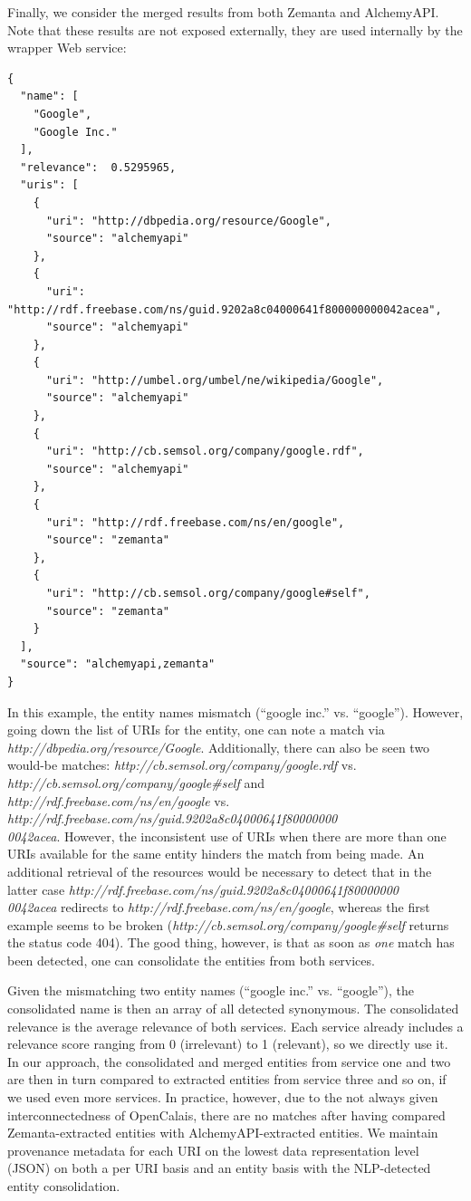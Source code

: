 Finally, we consider the merged results from both Zemanta and AlchemyAPI. Note that these results are not exposed externally, they are used internally by the wrapper Web service:

\begin{lstlisting}
{
  "name": [
    "Google",
    "Google Inc."
  ],
  "relevance":  0.5295965,
  "uris": [
    {
      "uri": "http://dbpedia.org/resource/Google",
      "source": "alchemyapi"
    },
    {
      "uri": "http://rdf.freebase.com/ns/guid.9202a8c04000641f800000000042acea",
      "source": "alchemyapi"
    },
    {
      "uri": "http://umbel.org/umbel/ne/wikipedia/Google",
      "source": "alchemyapi"
    },
    {
      "uri": "http://cb.semsol.org/company/google.rdf",
      "source": "alchemyapi"
    },
    {
      "uri": "http://rdf.freebase.com/ns/en/google",
      "source": "zemanta"
    },
    {
      "uri": "http://cb.semsol.org/company/google#self",
      "source": "zemanta"
    }
  ],
  "source": "alchemyapi,zemanta"
}
\end{lstlisting}

In this example, the entity names mismatch (``google inc.'' vs. ``google''). However, going down the list of URIs for
the entity, one can note a match via \textit{http://dbpedia.org/resource/Google}. Additionally, there can also
be seen two would-be matches: \textit{http://cb.semsol.org/company/google.rdf}
vs. \textit{http://cb.semsol.org/company/google\#self} and
\textit{http://rdf.freebase.com/ns/en/google} vs.
\textit{http://rdf.freebase.com/ns/guid.9202a8c04000641f80000000\\0042acea}. However, the inconsistent use of
URIs when there are more than one URIs available for the same entity hinders the match from being made. An additional
retrieval of the resources would be necessary to detect that in the latter case
\textit{http://rdf.freebase.com/ns/guid.9202a8c04000641f80000000\\0042acea} redirects to
\textit{http://rdf.freebase.com/ns/en/google}, whereas the first example seems to be broken
(\textit{http://cb.semsol.org/company/google\#self} returns the status code 404). The good thing, however, is
that as soon as \emph{one} match has been detected, one can consolidate the entities from both services.

Given the mismatching two entity names (``google inc.'' vs. ``google''), the consolidated name is then an array of all
detected synonymous. The consolidated relevance is the average relevance of both services. Each service already includes a relevance score ranging from
0 (irrelevant) to 1 (relevant), so we directly use it. In our approach, the consolidated and merged entities from
service one and two are then in turn compared to extracted entities from service three and so on, if we used even more
services. In practice, however, due to the not always given interconnectedness of OpenCalais, there are no matches
after having compared Zemanta-extracted entities with AlchemyAPI-extracted entities. We maintain provenance metadata for each URI on the lowest data representation level (JSON)
on both a per URI basis and an entity basis with the NLP-detected entity consolidation.


